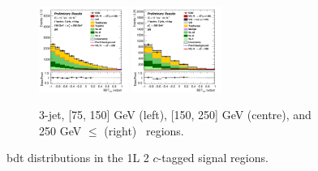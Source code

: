 \begin{figure}[h!]
\begin{subfigure}[b]{\textwidth}
        \includegraphics[width=0.32\textwidth]{Images/VH/Own_fit/postfit_VHcc/Region_distmva_BMax250_BMin150_DSR_J3_TTypext_T2_L1_Y6051_GlobalFit_conditionnal_mu1.png}
        \includegraphics[width=0.32\textwidth]{Images/VH/Own_fit/postfit_VHcc/Region_distmva_BMin250_DSR_J3_TTypext_T2_L1_Y6051_GlobalFit_conditionnal_mu1.png}
        \caption{3-jet, [75, 150] GeV (left), [150, 250] GeV (centre), and 250  GeV $\leq$ (right) \ptv\ regions.}
        \label{fig:plots_VHcc_1L_SR_3J_2c}
    \end{subfigure}
    \caption{\gls{bdt} distributions in the 1L 2 $c$-tagged signal regions.}
    \label{fig:plots_VHcc_1L_SR_2c}
\end{figure}
